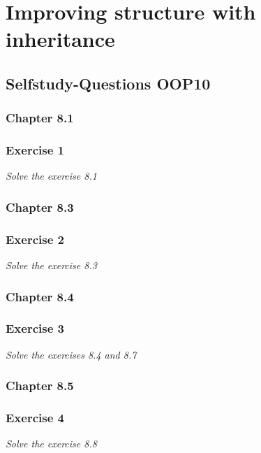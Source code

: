\section{Improving structure with inheritance}


\subsection{Selfstudy-Questions OOP10}

\subsubsection{Chapter 8.1}

\subsubsection*{Exercise 1}
\textit{Solve the exercise 8.1} \\

\subsubsection{Chapter 8.3}

\subsubsection*{Exercise 2}
\textit{Solve the exercise 8.3} \\

\subsubsection{Chapter 8.4}

\subsubsection*{Exercise 3}
\textit{Solve the exercises 8.4 and 8.7} \\

\subsubsection{Chapter 8.5}

\subsubsection*{Exercise 4}
\textit{Solve the exercise 8.8} \\


